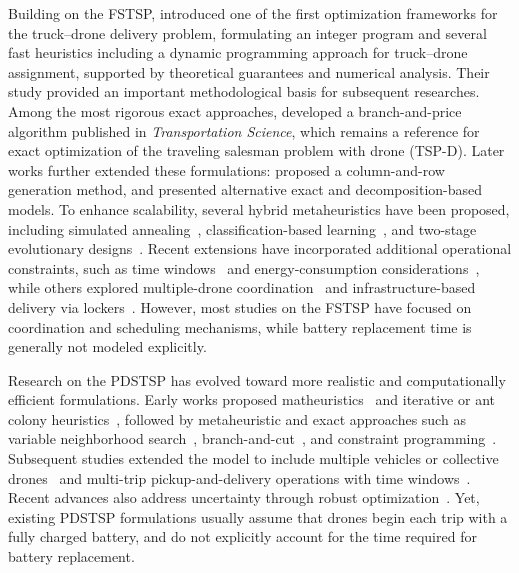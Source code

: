 \documentclass[3p, authoryear, 11pt]{elsarticle}
\begin{document}
Building on the FSTSP, \citet{agatz_optimization_2018} introduced one of the first optimization frameworks for the truck–drone delivery problem, formulating an integer program and several fast heuristics including a dynamic programming approach for truck–drone assignment, supported by theoretical guarantees and numerical analysis. Their study provided an important methodological basis for subsequent researches.
Among the most rigorous exact approaches, \citet{roberti_exact_2021} developed a branch-and-price algorithm published in \textit{Transportation Science}, which remains a reference for exact optimization of the traveling salesman problem with drone (TSP-D). Later works further extended these formulations: \citet{boccia_columnandrow_2021} proposed a column-and-row generation method, and \citet{dellamico_exact_2022} presented alternative exact and decomposition-based models. 
To enhance scalability, several hybrid metaheuristics have been proposed, including simulated annealing~\citep{yu_solving_2023}, classification-based learning~\citep{amitrano_classificationbased_2025}, and two-stage evolutionary designs~\citep{chen_twostage_2025}. 
Recent extensions have incorporated additional operational constraints, such as time windows~\citep{budak_hybrid_2023} and energy-consumption considerations~\citep{jeong_truckdrone_2019,aksit_flying_2024,esyurek_impact_2024}, while others explored multiple-drone coordination~\citep{rave_twoindexed_2025,schaumann_flying_2025} and infrastructure-based delivery via lockers~\citep{amitrano_new_2025}. 
However, most studies on the FSTSP have focused on coordination and scheduling mechanisms, while battery replacement time is generally not modeled explicitly.

Research on the PDSTSP has evolved toward more realistic and computationally efficient formulations. 
Early works proposed matheuristics~\citep{dellamico_matheuristic_2020} and iterative or ant colony heuristics~\citep{mbiadousaleu_iterative_2018,dinh_ants_2021}, followed by metaheuristic and exact approaches such as variable neighborhood search~\citep{lei_improved_2022}, branch-and-cut~\citep{nguyen_efficient_2023}, and constraint programming~\citep{montemanni_solving_2023}. 
Subsequent studies extended the model to include multiple vehicles or collective drones~\citep{saleu_parallel_2022,nguyen_parallel_2023,montemanni_parallel_2024} and multi-trip pickup-and-delivery operations with time windows~\citep{meng_multivisit_2025}. 
Recent advances also address uncertainty through robust optimization~\citep{barzanjeh_logicbased_2025}. 
Yet, existing PDSTSP formulations usually assume that drones begin each trip with a fully charged battery, and do not explicitly account for the time required for battery replacement.
\end{document}
